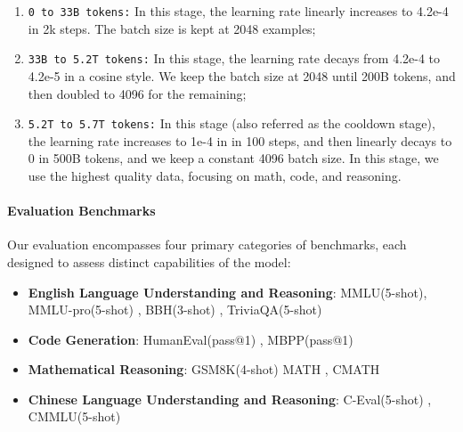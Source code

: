 \begin{enumerate}
    \item \texttt{0 to 33B tokens:} In this stage, the learning rate linearly increases to 4.2e-4 in 2k steps. The batch size is kept at 2048 examples;
    \item \texttt{33B to 5.2T tokens:} In this stage, the learning rate decays from 4.2e-4 to 4.2e-5 in a cosine style. We keep the batch size at 2048 until 200B tokens, and then doubled to 4096 for the remaining;
    \item \texttt{5.2T to 5.7T tokens:} In this stage (also referred as the cooldown stage), the learning rate increases to 1e-4 in in 100 steps, and then linearly decays to 0 in 500B tokens, and we keep a constant 4096 batch size. In this stage, we use the highest quality data, focusing on math, code, and reasoning.
\end{enumerate}

\paragraph{Evaluation Benchmarks} Our evaluation encompasses four primary categories of benchmarks, each designed to assess distinct capabilities of the model:

\begin{itemize}
    \item \textbf{English Language Understanding and Reasoning}: MMLU(5-shot)\citep{hendrycks2021measuringmassivemultitasklanguage}, MMLU-pro(5-shot) \citep{wang2024mmluprorobustchallengingmultitask}, BBH(3-shot) \citep{suzgun2022challengingbigbenchtaskschainofthought}, TriviaQA(5-shot) \citep{joshi2017triviaqalargescaledistantly}

    \item \textbf{Code Generation}: HumanEval(pass@1) \citep{chen2021codex}, MBPP(pass@1)\citep{austin2021programsynthesislargelanguage}
    
    \item  \textbf{Mathematical Reasoning}: GSM8K(4-shot) \citep{cobbe2021trainingverifierssolvemath} MATH \citep{hendrycks2021measuringmathematicalproblemsolving}, CMATH \citep{wei2023cmathlanguagemodelpass}

    \item \textbf{Chinese Language Understanding and Reasoning}: C-Eval(5-shot) \citep{huang2023cevalmultilevelmultidisciplinechinese}, CMMLU(5-shot)\citep{li2024cmmlumeasuringmassivemultitask}
\end{itemize}



